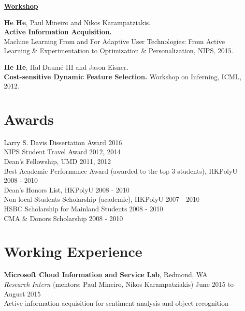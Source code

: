 \documentclass[margin,line]{resume}
\begin{document}
\begin{resume}
{\bf\underline{Workshop}}

{\bf He He}, Paul Mineiro and Nikos Karampatziakis. \\
{\bf Active Information Acquisition.}\\
Machine Learning From and For Adaptive User Technologies: From Active Learning \& Experimentation to Optimization \& Personalization, NIPS, 2015.%


{\bf He He}, Hal Daum\'e III and Jason Eisner.\\
{\bf Cost-sensitive Dynamic Feature Selection.}
Workshop on Inferning, ICML, 2012.

\section{\sc Awards}
Larry S. Davis Dissertation Award \hfill 2016\\
NIPS Student Travel Award \hfill 2012, 2014\\
Dean's Fellowship, UMD \hfill 2011, 2012 \\
Best Academic Performance Award (awarded to the top 3 students), HKPolyU \hfill 2008 - 2010\\
Dean's Honors List, HKPolyU \hfill 2008 - 2010\\
Non-local Students Scholarship (academic), HKPolyU \hfill 2007 - 2010\\
HSBC Scholarship for Mainland Students \hfill 2008 - 2010\\
CMA \& Donors Scholarship \hfill 2008 - 2010

%
\section{\sc Working Experience} 
{\bf Microsoft Cloud Information and Service Lab}, Redmond, WA\\
\emph{Research Intern} (mentors: Paul Mineiro, Nikos Karampatziakis) \hfill June 2015 to August 2015\\
Active information acquisition for sentiment analysis and object recognition 


\end{resume}
\end{document}
